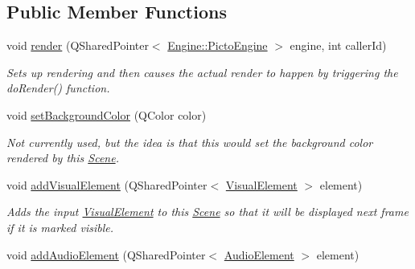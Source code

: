 \subsection*{Public Member Functions}
\begin{DoxyCompactItemize}
\item 
void \hyperlink{class_picto_1_1_scene_aaf9d9efc4da11b8596628a102b152de9}{render} (Q\-Shared\-Pointer$<$ \hyperlink{class_picto_1_1_engine_1_1_picto_engine}{Engine\-::\-Picto\-Engine} $>$ engine, int caller\-Id)
\begin{DoxyCompactList}\small\item\em Sets up rendering and then causes the actual render to happen by triggering the do\-Render() function. \end{DoxyCompactList}\item 
\hypertarget{class_picto_1_1_scene_a34b54232e27f489aa0c88ca4492882d3}{void \hyperlink{class_picto_1_1_scene_a34b54232e27f489aa0c88ca4492882d3}{set\-Background\-Color} (Q\-Color color)}\label{class_picto_1_1_scene_a34b54232e27f489aa0c88ca4492882d3}

\begin{DoxyCompactList}\small\item\em Not currently used, but the idea is that this would set the background color rendered by this \hyperlink{class_picto_1_1_scene}{Scene}. \end{DoxyCompactList}\item 
\hypertarget{class_picto_1_1_scene_a84a42dfd298e46798bf7fad2df2d3059}{void \hyperlink{class_picto_1_1_scene_a84a42dfd298e46798bf7fad2df2d3059}{add\-Visual\-Element} (Q\-Shared\-Pointer$<$ \hyperlink{struct_picto_1_1_visual_element}{Visual\-Element} $>$ element)}\label{class_picto_1_1_scene_a84a42dfd298e46798bf7fad2df2d3059}

\begin{DoxyCompactList}\small\item\em Adds the input \hyperlink{struct_picto_1_1_visual_element}{Visual\-Element} to this \hyperlink{class_picto_1_1_scene}{Scene} so that it will be displayed next frame if it is marked visible. \end{DoxyCompactList}\item 
\hypertarget{class_picto_1_1_scene_af4522aca529497fb2901ce69e3748c60}{void \hyperlink{class_picto_1_1_scene_af4522aca529497fb2901ce69e3748c60}{add\-Audio\-Element} (Q\-Shared\-Pointer$<$ \hyperlink{class_picto_1_1_audio_element}{Audio\-Element} $>$ element)}\label{class_picto_1_1_scene_af4522aca529497fb2901ce69e3748c60}


\end{DoxyCompactItemize}
